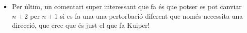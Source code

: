 {\begin{itemize}
\begin{itemize}
\begin{teo}
            Si una varietat Riemanniana oberta de dimensió $n$ té una immersió o encabiment $C^\infty$ curta en $E^{k}$ amb $k\ge n+2$ que no se solapa amb el seu conjunt límit (si aquest existeix), aleshores també té una immersió o encabiment, respectivament, isomètrica en $E^{k}$ del mateix tipus.
        \end{teo}
    \end{itemize}
    \item Per últim, un comentari super interessant que fa és que potser es pot canviar $n+2$ per $n+1$ si es fa una una pertorbació diferent que només necessita una direcció, que crec que és just el que fa Kuiper!
\end{itemize}

}









